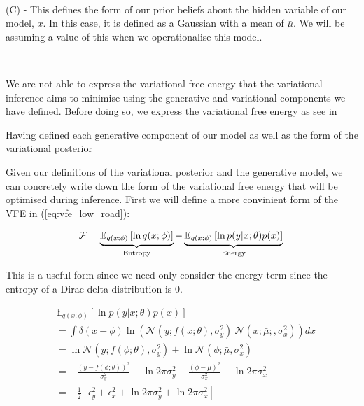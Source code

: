 \documentclass{article}
\newcommand{\refp}[1]{(\ref{#1})}
\begin{document}
\

(C) - This defines the form of our prior beliefs about the hidden variable of our model, $x$. In this case, it is defined as a Gaussian with a mean of $\bar{\mu}$. We will be assuming a value of this when we operationalise this model.

\

We are not able to express the variational free energy that the variational inference aims to minimise using the generative and variational components we have defined. Before doing so, we express the variational free energy as see in 


Having defined each generative component of our model as well as the form of the variational posterior 

Given our definitions of the variational posterior and the generative model, we can concretely write down the form of the variational free energy that will be optimised during inference. First we will define a more convinient form of the VFE in \refp{eq:vfe_low_road}:

\begin{equation}\label{eq:vfe_entropy_energy}
	\mathcal{F} = \underbrace{\mathbb{E}_{q(x ; \phi)} \left[ 	\ln q(x ; \phi) \right]}_{\text{Entropy}} - \underbrace{\mathbb{E}_{q(x ; \phi)} \left[ 	\ln p(y | x ; \theta) p(x) \right]}_{\text{Energy}} \\
\end{equation}

This is a useful form since we need only consider the energy term since the entropy of a Dirac-delta distribution is 0.

\begin{equation}\label{eq:pc_vfe}
	\begin{aligned}
	& \mathbb{E}_{q(x ; \phi)} \left[ 	\ln p(y | x ; \theta) p(x) \right] \\
	&= \int \delta(x - \phi) \ln \left( \mathcal{N}(y ; f(x; \theta), \sigma^2_y) \ \mathcal{N}(x; \bar{\mu};, \sigma^2_x) \right) dx \\
		&= \ln \mathcal{N}(y; f(\phi; \theta), \sigma^2_y) + \ln \mathcal{N}(\phi; \bar{\mu}, \sigma^2_x) \\
		&= - \frac{(y - f(\phi; \theta))^2}{\sigma^2_y} - \ln 2 \pi \sigma^2_y - \frac{(\phi - \bar{\mu})^2}{\sigma^2_x} - \ln 2 \pi \sigma^2_x \\
		&= - \frac{1}{2}\left[ \epsilon_y^2 + \epsilon_x^2 +\ln 2 \pi \sigma^2_y +\ln 2 \pi \sigma^2_x  \right]
	\end{aligned}
\end{equation}
\end{document}
